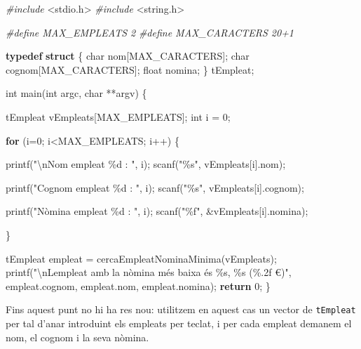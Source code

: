 \documentclass[]{book}
\newenvironment{Shaded}{\begin{snugshade}}{\end{snugshade}}
\newcommand{\ControlFlowTok}[1]{\textcolor[rgb]{0.13,0.29,0.53}{\textbf{#1}}}
\newcommand{\DataTypeTok}[1]{\textcolor[rgb]{0.13,0.29,0.53}{#1}}
\newcommand{\DecValTok}[1]{\textcolor[rgb]{0.00,0.00,0.81}{#1}}
\newcommand{\ImportTok}[1]{#1}
\newcommand{\KeywordTok}[1]{\textcolor[rgb]{0.13,0.29,0.53}{\textbf{#1}}}
\newcommand{\NormalTok}[1]{#1}
\newcommand{\PreprocessorTok}[1]{\textcolor[rgb]{0.56,0.35,0.01}{\textit{#1}}}
\newcommand{\SpecialCharTok}[1]{\textcolor[rgb]{0.00,0.00,0.00}{#1}}
\newcommand{\StringTok}[1]{\textcolor[rgb]{0.31,0.60,0.02}{#1}}
\begin{document}
\begin{Shaded}
\begin{Highlighting}[]
\PreprocessorTok{\#include }\ImportTok{\textless{}stdio.h\textgreater{}}
\PreprocessorTok{\#include }\ImportTok{\textless{}string.h\textgreater{}}

\PreprocessorTok{\#define MAX\_EMPLEATS 2}
\PreprocessorTok{\#define MAX\_CARACTERS 20+1}

\KeywordTok{typedef} \KeywordTok{struct}\NormalTok{ \{}
    \DataTypeTok{char}\NormalTok{ nom[MAX\_CARACTERS];}
    \DataTypeTok{char}\NormalTok{ cognom[MAX\_CARACTERS];}
    \DataTypeTok{float}\NormalTok{ nomina;}
\NormalTok{\} tEmpleat;}

\DataTypeTok{int}\NormalTok{ main(}\DataTypeTok{int}\NormalTok{ argc, }\DataTypeTok{char}\NormalTok{ **argv) \{}

\NormalTok{    tEmpleat vEmpleats[MAX\_EMPLEATS];}
    \DataTypeTok{int}\NormalTok{ i = }\DecValTok{0}\NormalTok{;}

    \ControlFlowTok{for}\NormalTok{ (i=}\DecValTok{0}\NormalTok{; i\textless{}MAX\_EMPLEATS; i++) \{}

\NormalTok{        printf(}\StringTok{"}\SpecialCharTok{\textbackslash{}n}\StringTok{Nom empleat \%d : "}\NormalTok{, i);}
\NormalTok{        scanf(}\StringTok{"\%s"}\NormalTok{, vEmpleats[i].nom);}

\NormalTok{        printf(}\StringTok{"Cognom empleat \%d : "}\NormalTok{, i);}
\NormalTok{        scanf(}\StringTok{"\%s"}\NormalTok{, vEmpleats[i].cognom);}

\NormalTok{        printf(}\StringTok{"Nòmina empleat \%d : "}\NormalTok{, i);}
\NormalTok{        scanf(}\StringTok{"\%f"}\NormalTok{, \&vEmpleats[i].nomina);}

\NormalTok{    \}}

\NormalTok{    tEmpleat empleat = cercaEmpleatNominaMinima(vEmpleats);}
\NormalTok{    printf(}\StringTok{"}\SpecialCharTok{\textbackslash{}n}\StringTok{L\textquotesingle{}empleat amb la nòmina més baixa és \%s, \%s (\%.2f €)"}\NormalTok{, empleat.cognom, empleat.nom, empleat.nomina);}
    \ControlFlowTok{return} \DecValTok{0}\NormalTok{;}
\NormalTok{\}}
\end{Highlighting}
\end{Shaded}

Fins aquest punt no hi ha res nou: utilitzem en aquest cas un vector de \texttt{tEmpleat} per tal d'anar introduint els empleats per teclat, i per cada empleat demanem el nom, el cognom i la seva nòmina.
\end{document}
